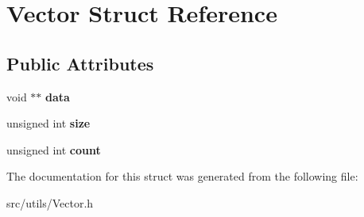 \hypertarget{struct_vector}{}\section{Vector Struct Reference}
\label{struct_vector}
\subsection*{Public Attributes}
\begin{DoxyCompactItemize}
\item 
\mbox{\label{struct_vector_ae33d8e69039b6b32e5d1fc6a9f25724e}} 
void $\ast$$\ast$ {\bfseries data}
\item 
\mbox{\label{struct_vector_a62edf2e9dc64399c5276c154284af899}} 
unsigned int {\bfseries size}
\item 
\mbox{\label{struct_vector_adca805e0982188b6c0ffafc05381a9e3}} 
unsigned int {\bfseries count}
\end{DoxyCompactItemize}


The documentation for this struct was generated from the following file\+:\begin{DoxyCompactItemize}
\item 
src/utils/Vector.\+h\end{DoxyCompactItemize}
